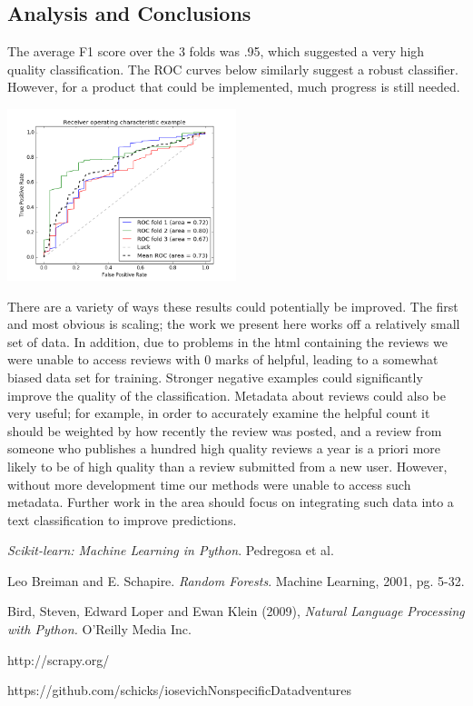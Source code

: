 \documentclass{article}
\newenvironment{Figure}
	{\par\medskip\noindent}
	{\par\medskip}
\begin{document}
\begin{multicols}{2}
\section{Analysis and Conclusions}
The average F1 score over the 3 folds was .95, which suggested a very high quality classification. The ROC curves below similarly suggest a robust classifier. However, for a product that could be implemented, much progress is still needed.
\begin{Figure}
	\includegraphics[width=0.5\textwidth]{ROC}
\end{Figure}

There are a variety of ways these results could potentially be improved. The first and most obvious is scaling; the work we present here works off a relatively small set of data. In addition, due to problems in the html containing the reviews we were unable to access reviews with 0 marks of helpful, leading to a somewhat biased data set for training. Stronger negative examples could significantly improve the quality of the classification. Metadata about reviews could also be very useful; for example, in order to accurately examine the helpful count it should be weighted by how recently the review was posted, and a review from someone who publishes a hundred high quality reviews a year is a priori more likely to be of high quality than a review submitted from a new user. However, without more development time our methods were unable to access such metadata. Further work in the area should focus on integrating such data into a text classification to improve predictions.
\end{multicols}

\begin{thebibliography}{9}
	 \textit{Scikit-learn: Machine Learning in Python}. Pedregosa et al.
	
	 Leo Breiman and E. Schapire. \textit{Random Forests}. Machine Learning, 2001, pg. 5-32.
	
	 Bird, Steven, Edward Loper and Ewan Klein (2009), \textit{Natural Language Processing with Python.} O’Reilly Media Inc.
	
	 http://scrapy.org/
	
	 https://github.com/schicks/iosevichNonspecificDatadventures
\end{thebibliography}
\end{document}
